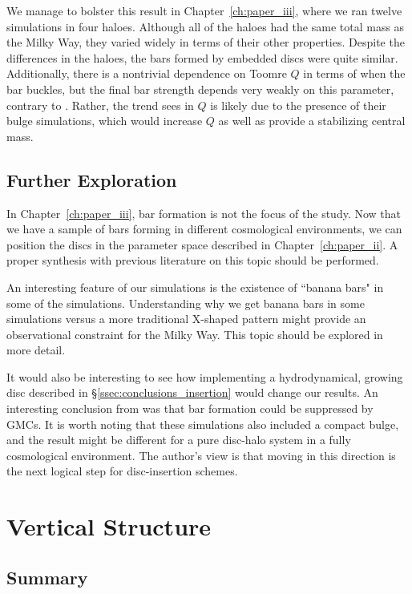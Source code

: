 We manage to bolster this result in Chapter~\ref{ch:paper_iii}, where we ran twelve simulations in four haloes. Although all of the haloes had the same total mass as the Milky Way, they varied widely in terms of their other properties. Despite the differences in the haloes, the bars formed by embedded discs were quite similar. Additionally, there is a nontrivial dependence on Toomre $Q$ in terms of when the bar buckles, but the final bar strength depends very weakly on this parameter, contrary to \citet{YurinSpringelStellarDisks}. Rather, the trend \citet{YurinSpringelStellarDisks} sees in $Q$ is likely due to the presence of their bulge simulations, which would increase $Q$ as well as provide a stabilizing central mass.


\subsection{Further Exploration}


In Chapter~\ref{ch:paper_iii}, bar formation is not the focus of the study. Now that we have a sample of bars forming in different cosmological environments, we can position the discs in the parameter space described in Chapter~\ref{ch:paper_ii}. A proper synthesis with previous literature on this topic should be performed.

An interesting feature of our simulations is the existence of ``banana bars" in some of the simulations. Understanding why we get banana bars in some simulations versus a more traditional X-shaped pattern might provide an observational constraint for the Milky Way. This topic should be explored in more detail.

It would also be interesting to see how implementing a hydrodynamical, growing disc described in \S\ref{ssec:conclusions_insertion} would change our results. An interesting conclusion from \citet{aumer_2016} was that bar formation could be suppressed by GMCs. It is worth noting that these simulations also included a compact bulge, and the result might be different for a pure disc-halo system in a fully cosmological environment. The author's view is that moving in this direction is the next logical step for disc-insertion schemes. 



\section{Vertical Structure}
\subsection{Summary}

